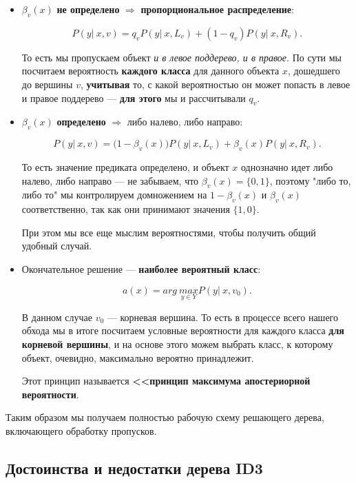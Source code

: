 \documentclass{article}
\begin{document}
\begin{enumerate}
	\begin{itemize}
	\item $\beta_v(x)$ \textbf{не определено} $\Rightarrow$ \textbf{пропорциональное распределение}:
	
	$$P(y |\ x,v) = q_v P(y|\ x, L_v) + (1 - q_v) P(y|\ x, R_v).$$
	
	То есть мы пропускаем объект \textit{и в левое поддерево, и в правое}. По сути мы посчитаем вероятность \textbf{каждого класса} для данного объекта $x$, дошедшего до вершины $v$, \textbf{учитывая} то, с какой вероятностью он может попасть в левое и правое поддерево --- \textbf{для этого} мы и рассчитывали $q_v$.
	
	\item $\beta_v(x)$ \textbf{определено} $\Rightarrow$ либо налево, либо направо:
	
	$$P(y|\ x, v) = \bigl(1 - \beta_v(x)\bigr)P(y|\ x, L_v) + \beta_v(x)P(y|\ x, R_v).$$
	
	То есть значение предиката определено, и объект $x$ однозначно идет либо налево, либо направо --- не забываем, что $\beta_v(x) = \{0, 1\}$, поэтому "либо то, либо то" мы контролируем домножением на $1 - \beta_v(x)$ и $\beta_v(x)$ соответственно, так как они принимают значения $\{1,0\}$. 
	
	При этом мы все еще мыслим вероятностями, чтобы получить общий удобный случай.
	
	\item Окончательное решение --- \textbf{наиболее вероятный класс}:
	
	$$a(x) = arg\ \underset{y\in Y}{max}P(y|\ x, v_0).$$
	
	В данном случае $v_0$ --- корневая вершина. То есть в процессе всего нашего обхода мы в итоге посчитаем условные вероятности для каждого класса \textbf{для корневой вершины}, и на основе этого можем выбрать класс, к которому объект, очевидно, максимально вероятно принадлежит.
	
	Этот принцип называется \textbf{<<принцип максимума апостериорной вероятности}.
	
	\end{itemize}
\end{enumerate}

Таким образом мы получаем полностью рабочую схему решающего дерева, включающего обработку пропусков.

\subsection{Достоинства и недостатки дерева ID3}
\end{document}
